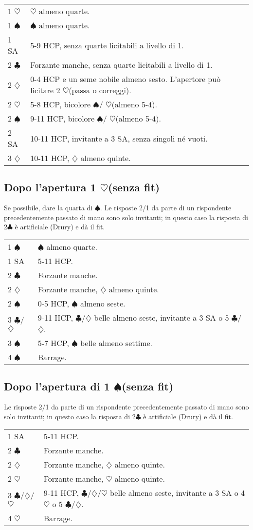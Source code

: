 \documentclass[a4paper,10pt]{article}
\renewcommand{\c}{$\clubsuit$\xspace}
\renewcommand{\d}{$\diamondsuit$\xspace}
\newcommand{\h}{$\heartsuit$\xspace}
\newcommand{\s}{$\spadesuit$\xspace}
\newcommand{\sa}{SA\xspace}
\newcommand{\smallspace}{\vskip0.3cm}
\newenvironment{twocol}
  {\smallspace\noindent\begin{tabular}{l p{0.78\textwidth}}}
  {\end{tabular}\smallspace}
\begin{document}
\begin{twocol}
  1 \h & \h almeno quarte.\\
  1 \s & \s almeno quarte.\\
  1 \sa & 5-9 HCP, senza quarte licitabili a livello di 1. \\
  2 \c & Forzante manche, senza quarte licitabili a livello di 1. \\
  2 \d & 0-4 HCP e un seme nobile almeno sesto. L'apertore può licitare 2 \h (passa o correggi). \\
  2 \h & 5-8 HCP, bicolore \s / \h (almeno 5-4). \\
  2 \s & 9-11 HCP, bicolore \s / \h (almeno 5-4). \\
  2 \sa & 10-11 HCP, invitante a 3 \sa, senza singoli né vuoti.\\
  3 \d & 10-11 HCP, \d almeno quinte.
\end{twocol}


\subsection{Dopo l'apertura 1 \h (senza fit)}

Se possibile, dare la quarta di \s.
Le risposte 2/1 da parte di un rispondente precedentemente passato di mano sono solo invitanti; in questo caso la risposta di 2\c è artificiale (Drury) e dà il fit. 
\begin{twocol}
  1 \s & \s almeno quarte.\\
  1 \sa & 5-11 HCP. \\
  2 \c & Forzante manche. \\
  2 \d & Forzante manche, \d almeno quinte.\\
  2 \s & 0-5 HCP, \s almeno seste.\\
  3 \c/\d & 9-11 HCP, \c/\d belle almeno seste, invitante a 3 \sa o 5 \c/\d.\\
  3 \s & 5-7 HCP, \s belle almeno settime.\\
  4 \s & Barrage.
  
\end{twocol}


\subsection{Dopo l'apertura di 1 \s (senza fit)}
Le risposte 2/1 da parte di un rispondente precedentemente passato di mano sono solo invitanti; in questo caso la risposta di 2\c è artificiale (Drury) e dà il fit. 
\begin{twocol}
  1 \sa & 5-11 HCP. \\
  2 \c & Forzante manche. \\
  2 \d & Forzante manche, \d almeno quinte.\\
  2 \h & Forzante manche, \h almeno quinte.\\
  3 \c/\d/\h & 9-11 HCP, \c/\d/\h belle almeno seste, invitante a 3 \sa o 4 \h o 5 \c/\d.\\
  4 \h & Barrage.
\end{twocol}
\end{document}
